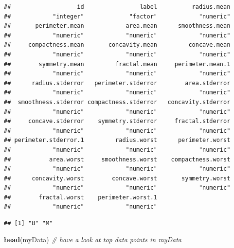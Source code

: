 \documentclass[]{article}
\newenvironment{Shaded}{\begin{snugshade}}{\end{snugshade}}
\newcommand{\CommentTok}[1]{\textcolor[rgb]{0.56,0.35,0.01}{\textit{#1}}}
\newcommand{\KeywordTok}[1]{\textcolor[rgb]{0.13,0.29,0.53}{\textbf{#1}}}
\newcommand{\NormalTok}[1]{#1}
\newcommand{\OperatorTok}[1]{\textcolor[rgb]{0.81,0.36,0.00}{\textbf{#1}}}
\begin{document}
\begin{verbatim}
##                   id                label          radius.mean 
##            "integer"             "factor"            "numeric" 
##       perimeter.mean            area.mean      smoothness.mean 
##            "numeric"            "numeric"            "numeric" 
##     compactness.mean       concavity.mean         concave.mean 
##            "numeric"            "numeric"            "numeric" 
##        symmetry.mean         fractal.mean     perimeter.mean.1 
##            "numeric"            "numeric"            "numeric" 
##      radius.stderror   perimeter.stderror        area.stderror 
##            "numeric"            "numeric"            "numeric" 
##  smoothness.stderror compactness.stderror   concavity.stderror 
##            "numeric"            "numeric"            "numeric" 
##     concave.stderror    symmetry.stderror     fractal.stderror 
##            "numeric"            "numeric"            "numeric" 
## perimeter.stderror.1         radius.worst      perimeter.worst 
##            "numeric"            "numeric"            "numeric" 
##           area.worst     smoothness.worst    compactness.worst 
##            "numeric"            "numeric"            "numeric" 
##      concavity.worst        concave.worst       symmetry.worst 
##            "numeric"            "numeric"            "numeric" 
##        fractal.worst    perimeter.worst.1 
##            "numeric"            "numeric"
\end{verbatim}

\begin{Shaded}
\end{Shaded}

\begin{verbatim}
## [1] "B" "M"
\end{verbatim}

\begin{Shaded}
\begin{Highlighting}[]
\KeywordTok{head}\NormalTok{(myData) }\CommentTok{# have a look at top data points in myData}
\end{Highlighting}
\end{Shaded}
\end{document}
